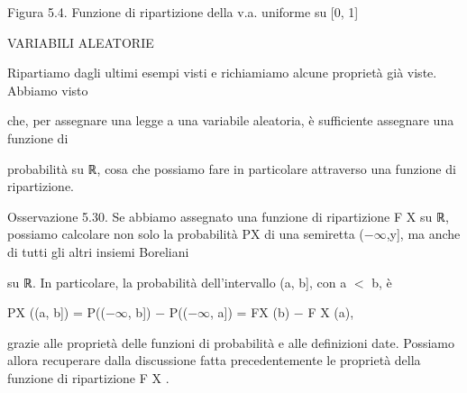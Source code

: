 \documentclass[a4paper,portrait,12pt]{article}
\begin{document}
\begin{flushleft}
Figura 5.4. Funzione di ripartizione della v.a. uniforme su [0, 1]
\end{flushleft}










\begin{flushleft}
VARIABILI ALEATORIE
\end{flushleft}





\begin{flushleft}
Ripartiamo dagli ultimi esempi visti e richiamiamo alcune propriet\`{a} gi\`{a} viste. Abbiamo visto
\end{flushleft}


\begin{flushleft}
che, per assegnare una legge a una variabile aleatoria, \`{e} sufficiente assegnare una funzione di
\end{flushleft}


\begin{flushleft}
probabilit\`{a} su ℝ, cosa che possiamo fare in particolare attraverso una funzione di ripartizione.
\end{flushleft}


\begin{flushleft}
Osservazione 5.30. Se abbiamo assegnato una funzione di ripartizione F X su ℝ, possiamo calcolare non solo la probabilit\`{a} PX di una semiretta ($-$$\infty$,y], ma anche di tutti gli altri insiemi Boreliani
\end{flushleft}


\begin{flushleft}
su ℝ. In particolare, la probabilit\`{a} dell'intervallo (a, b], con a $<$ b, \`{e}
\end{flushleft}


\begin{flushleft}
PX ((a, b]) = P(($-$$\infty$, b]) $-$ P(($-$$\infty$, a]) = FX (b) $-$ F X (a),
\end{flushleft}


\begin{flushleft}
grazie alle propriet\`{a} delle funzioni di probabilit\`{a} e alle definizioni date. Possiamo allora recuperare dalla discussione fatta precedentemente le propriet\`{a} della funzione di ripartizione F X .
\end{flushleft}
\end{document}
